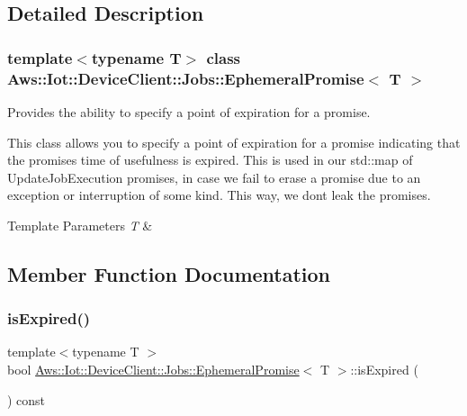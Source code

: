 \subsection{Detailed Description}
\subsubsection*{template$<$typename T$>$\newline
class Aws\+::\+Iot\+::\+Device\+Client\+::\+Jobs\+::\+Ephemeral\+Promise$<$ T $>$}

Provides the ability to specify a point of expiration for a promise. 

This class allows you to specify a point of expiration for a promise indicating that the promise\textquotesingle{}s time of usefulness is expired. This is used in our std\+::map of Update\+Job\+Execution promises, in case we fail to erase a promise due to an exception or interruption of some kind. This way, we don\textquotesingle{}t leak the promises. 
\begin{DoxyTemplParams}{Template Parameters}
{\em T} & \\
\hline
\end{DoxyTemplParams}


\subsection{Member Function Documentation}
\mbox{\label{class_aws_1_1_iot_1_1_device_client_1_1_jobs_1_1_ephemeral_promise_a4cdc9ca2aaf0aac6a397a1e2a9214c90}} 
\subsubsection{\texorpdfstring{is\+Expired()}{isExpired()}}
{\footnotesize\ttfamily template$<$typename T $>$ \\
bool \hyperlink{class_aws_1_1_iot_1_1_device_client_1_1_jobs_1_1_ephemeral_promise}{Aws\+::\+Iot\+::\+Device\+Client\+::\+Jobs\+::\+Ephemeral\+Promise}$<$ T $>$\+::is\+Expired (\begin{DoxyParamCaption}{ }\end{DoxyParamCaption}) const\hspace{0.3cm}{\ttfamily [inline]}}




